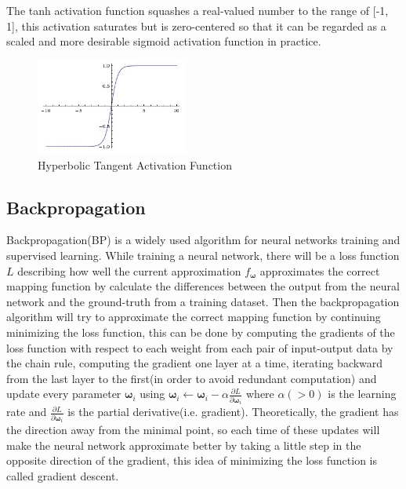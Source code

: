 \begin{itemize}
    The tanh activation function squashes a real-valued number to the range of [-1, 1], this activation
    saturates but is zero-centered so that it can be regarded as a scaled and more desirable sigmoid 
    activation function in practice.
    \begin{figure}[H]
        \begin{center}
        \includegraphics[width=5cm]{figures/tanh}
        \end{center}
        \caption{Hyperbolic Tangent Activation Function}
        \label{fig:tanh}
    \end{figure}
    
\end{itemize}

\subsection{Backpropagation}
Backpropagation(BP) is a widely used algorithm for neural networks training and
supervised learning. While training a neural network, there will be a loss function
$L$ describing how well the current approximation $f_{\boldsymbol{\omega}}$ approximates
the correct mapping function by calculate the differences between the output from the 
neural network and the ground-truth from a training dataset. Then the backpropagation algorithm 
will try to approximate the correct mapping function by continuing minimizing the loss function, 
this can be done by computing the gradients of the loss function with respect to 
each weight from each pair of input-output data by the chain rule, 
computing the gradient one layer at a time, iterating backward from the last layer to 
the first(in order to avoid redundant computation) and update every parameter 
${\boldsymbol{\omega}_{i}}$ using 
$\boldsymbol{\omega}_{i} \leftarrow \boldsymbol{\omega}_{i}-\alpha \frac{\partial L}{\partial \boldsymbol{\omega}_{i}}$
where $\alpha(>0)$ is the learning rate and $\frac{\partial L}{\partial \boldsymbol{\omega}_{i}}$ is the partial
derivative(i.e. gradient). Theoretically, the gradient has the direction away from the minimal point, 
so each time of these updates will make the neural network 
approximate better by taking a little step in the opposite direction of the gradient, this idea 
of minimizing the loss function is called gradient descent.

